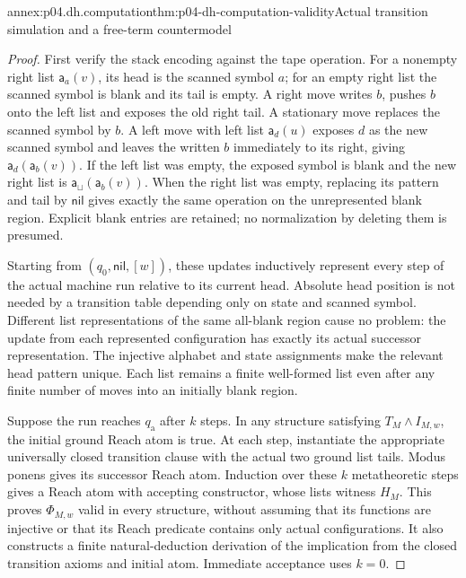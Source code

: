 \begin{annexitem}{annex:p04.dh.computation}{thm:p04-dh-computation-validity}{Actual transition simulation and a free-term countermodel}
\begin{proof}
First verify the stack encoding against the tape operation. For a nonempty
right list \(\mathsf a_a(v)\), its head is the scanned symbol \(a\);
for an empty right list the scanned symbol is blank and its tail is
empty. A right move writes \(b\), pushes \(b\) onto the left list and
exposes the old right tail. A stationary move replaces the scanned
symbol by \(b\). A left move with left list \(\mathsf a_d(u)\) exposes
\(d\) as the new scanned symbol and leaves the written \(b\) immediately
to its right, giving \(\mathsf a_d(\mathsf a_b(v))\).
If the left list was empty, the exposed symbol is blank and the new
right list is \(\mathsf a_{\sqcup}(\mathsf a_b(v))\).
When the right list was empty, replacing its pattern and tail by
\(\mathsf{nil}\) gives exactly the same operation on the unrepresented
blank region. Explicit blank entries are retained; no normalization
by deleting them is presumed.

Starting from \((q_0,\mathsf{nil},[w])\), these updates inductively
represent every step of the actual machine run relative to its current
head. Absolute head position is not needed by a transition table depending
only on state and scanned symbol. Different list representations of the
same all-blank region cause no problem: the update from each represented
configuration has exactly its actual successor representation. The
injective alphabet and state assignments make the relevant head pattern
unique. Each list remains a finite well-formed list even after any finite
number of moves into an initially blank region.

Suppose the run reaches \(q_{\mathrm a}\) after \(k\) steps. In any
structure satisfying \(T_M\land I_{M,w}\), the initial ground Reach atom
is true. At each step, instantiate the appropriate universally closed
transition clause with the actual two ground list tails. Modus ponens
gives its successor Reach atom. Induction over these \(k\) metatheoretic
steps gives a Reach atom with accepting constructor, whose lists witness
\(H_M\). This proves \(\Phi_{M,w}\) valid in every structure, without
assuming that its functions are injective or that its Reach predicate
contains only actual configurations. It also constructs a finite
natural-deduction derivation of the implication from the closed
transition axioms and initial atom. Immediate acceptance uses \(k=0\).


\end{proof}
\end{annexitem}

